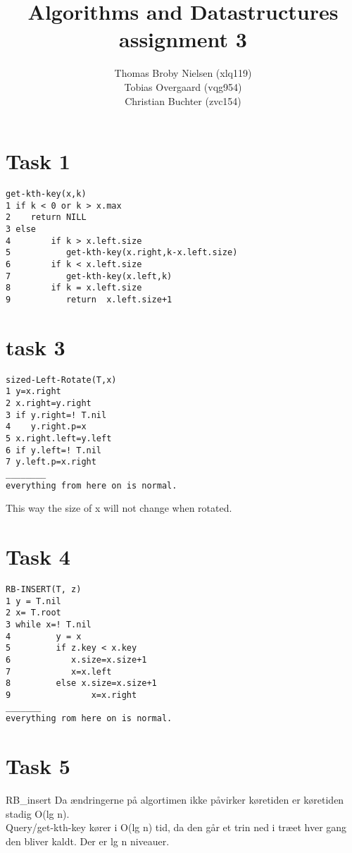 \documentclass[12pt]{article}
\title{Algorithms and Datastructures assignment 3}
\author{Thomas Broby Nielsen (xlq119)\\ Tobias Overgaard (vqg954)\\ Christian Buchter (zvc154)}
\begin{document}
\maketitle

\tableofcontents

\pagebreak
\section{Task 1}
\begin{verbatim}
get-kth-key(x,k)
1 if k < 0 or k > x.max
2    return NILL
3 else
4        if k > x.left.size
5           get-kth-key(x.right,k-x.left.size)
6        if k < x.left.size
7           get-kth-key(x.left,k)
8        if k = x.left.size
9           return  x.left.size+1
\end{verbatim}

\newpage
\section{task 3}
\begin{verbatim}
sized-Left-Rotate(T,x)
1 y=x.right
2 x.right=y.right
3 if y.right=! T.nil
4    y.right.p=x
5 x.right.left=y.left
6 if y.left=! T.nil
7 y.left.p=x.right
________
everything from here on is normal.
\end{verbatim}
This way the size of x will not change when rotated.
\newpage

\section{Task 4}
\begin{verbatim}
RB-INSERT(T, z)
1 y = T.nil
2 x= T.root
3 while x=! T.nil
4         y = x
5         if z.key < x.key
6            x.size=x.size+1
7            x=x.left
8         else x.size=x.size+1
9                x=x.right
_______
everything rom here on is normal.
\end{verbatim}
\newpage

\section{Task 5}
RB\_insert Da ændringerne på algortimen ikke påvirker køretiden er køretiden stadig O(lg n).\\
Query/get-kth-key kører i O(lg n) tid, da den går et trin ned i træet hver gang den bliver kaldt. Der er lg n niveauer.
\end{document}
